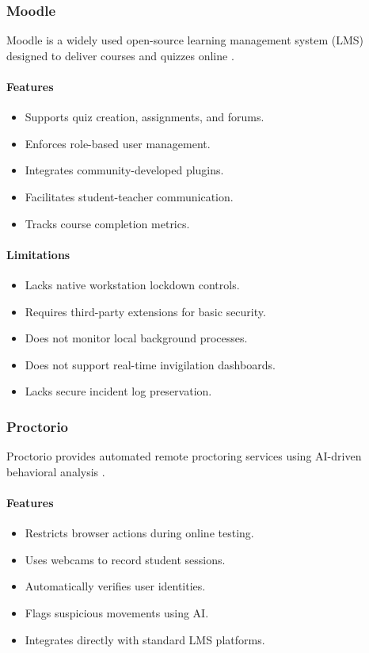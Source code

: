 \subsubsection{Moodle}
Moodle is a widely used open-source learning management system (LMS) designed to deliver courses and quizzes online \cite{moodle1}.

\paragraph{Features}
\begin{itemize}[noitemsep]
\item Supports quiz creation, assignments, and forums.
\item Enforces role-based user management.
\item Integrates community-developed plugins.
\item Facilitates student-teacher communication.
\item Tracks course completion metrics.
\end{itemize}

\paragraph{Limitations}
\begin{itemize}[noitemsep]
\item Lacks native workstation lockdown controls.
\item Requires third-party extensions for basic security.
\item Does not monitor local background processes.
\item Does not support real-time invigilation dashboards.
\item Lacks secure incident log preservation.
\end{itemize}

\subsubsection{Proctorio}
Proctorio provides automated remote proctoring services using AI-driven behavioral analysis \cite{proctorio1}.

\paragraph{Features}
\begin{itemize}[noitemsep]
\item Restricts browser actions during online testing.
\item Uses webcams to record student sessions.
\item Automatically verifies user identities.
\item Flags suspicious movements using AI.
\item Integrates directly with standard LMS platforms.
\end{itemize}

